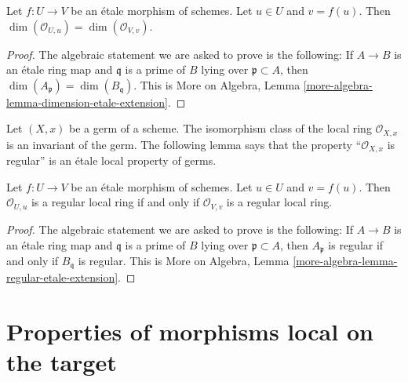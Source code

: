 \begin{lemma}
\label{lemma-dimension-local-ring-local}
Let $f : U \to V$ be an \'etale morphism of schemes.
Let $u \in U$ and $v = f(u)$. Then
$\dim(\mathcal{O}_{U, u}) = \dim(\mathcal{O}_{V, v})$.
\end{lemma}

\begin{proof}
The algebraic statement we are asked to prove is the following:
If $A \to B$ is an \'etale ring map and $\mathfrak q$ is a prime of
$B$ lying over $\mathfrak p \subset A$, then
$\dim(A_{\mathfrak p}) = \dim(B_{\mathfrak q})$.
This is
More on Algebra, Lemma \ref{more-algebra-lemma-dimension-etale-extension}.
\end{proof}

\noindent
Let $(X, x)$ be a germ of a scheme.
The isomorphism class of the local ring $\mathcal{O}_{X, x}$
is an invariant of the germ. The following lemma says that the
property ``$\mathcal{O}_{X, x}$ is regular'' is an \'etale local property
of germs.

\begin{lemma}
\label{lemma-regular-local-ring-local}
Let $f : U \to V$ be an \'etale morphism of schemes.
Let $u \in U$ and $v = f(u)$. Then
$\mathcal{O}_{U, u}$ is a regular local ring if and only if
$\mathcal{O}_{V, v}$ is a regular local ring.
\end{lemma}

\begin{proof}
The algebraic statement we are asked to prove is the following:
If $A \to B$ is an \'etale ring map and $\mathfrak q$ is a prime of
$B$ lying over $\mathfrak p \subset A$, then
$A_{\mathfrak p}$ is regular if and only if $B_{\mathfrak q}$ is regular.
This is More on Algebra, Lemma
\ref{more-algebra-lemma-regular-etale-extension}.
\end{proof}







\section{Properties of morphisms local on the target}
\label{section-descending-properties-morphisms}

